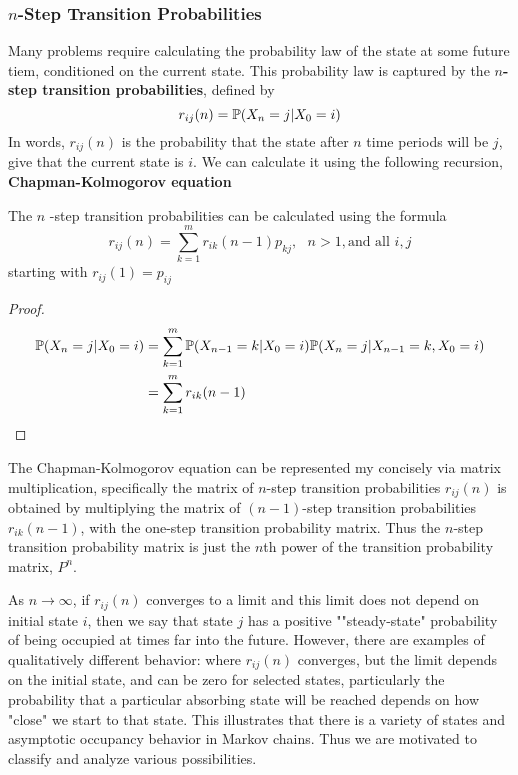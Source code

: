\documentclass[11pt]{scrartcl}
\begin{document}
\subsubsection{$n$-Step Transition Probabilities}
Many problems require calculating the probability law of the state at some
future tiem, conditioned on the current state. This probability law is captured
by the $n$\textbf{-step transition probabilities}, defined by  \[
  r_{ij}(n) = \mathbb{P}(X_{n}=j | X_0 = i)
\] In words, $r_{ij}(n)$  is the probability that the state after $n$  time
periods will be $j$, give that the current state is $i$. We can calculate it
using the following recursion, \textbf{Chapman-Kolmogorov equation}  
\begin{theorem}
  The $n$ -step transition probabilities can be calculated using the formula \[
    r_{ij}(n) = \sum_{k=1}^{m} r_{ik}(n-1)p_{kj}, ~~~n>1, \text{and all }i,j
  \] starting with $r_{ij}(1) = p_{ij}$
  \begin{proof}
    \begin{align*}
      \mathbb{P}(X_{n}= j | X_0 = i) &= \sum_{k=1}^{m} \mathbb{P}(X_{n-1}=k | X_0
      =i)\mathbb{P}(X_{n} = j | X_{n-1}=k, X_0=i) \\ &= \sum_{k=1}^{m} r_{ik}(n-1)
    \end{align*}
  \end{proof}
The Chapman-Kolmogorov equation can be represented my concisely via matrix
multiplication, specifically the matrix of $n$-step transition probabilities
$r_{ij}(n)$ is obtained by multiplying the matrix of $(n-1)$-step transition
probabilities $r_{ik}(n-1)$, with the one-step transition probability matrix.
Thus the $n$-step transition probability matrix is just the $n$th power of the
transition probability matrix, $P^{n} $.
\end{theorem}
As $n\to \infty$, if $r_{ij}(n)$ converges to a limit and this limit does not
depend on initial state $i$, then we say that state $j$ has a positive
""steady-state" probability of being occupied at times far into the future.
However, there are examples of qualitatively different behavior: where
$r_{ij}(n)$ converges, but the limit depends on the initial state, and can be
zero for selected states, particularly the probability that a particular
absorbing state will be reached depends on how "close" we start to that state.
This illustrates that there is a variety of states and asymptotic occupancy
behavior in Markov chains. Thus we are motivated to classify and analyze
various possibilities. 
\end{document}
